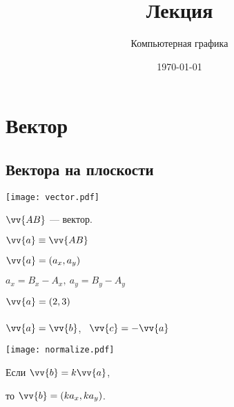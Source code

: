 \documentclass[10pt]{beamer}
\date{\today}
\title{Лекция \lecdni \\ \LectionTheme}
\subtitle{Компьютерная графика}
\begin{document}
	 

    
    \QRFRAME
	
	
	\frame{\maketitle}
	


	
	\begin{frame}
		\tableofcontents
	\end{frame}
	
	\section{Вектор}
	\subsection{Вектора на плоскости}
	
	\frame{\sectionpage}
	
    {   
    	{
    		 
			\texttt{[image: vector.pdf]}
    		

    	}
    	{
    		$\vv{AB}$ --- вектор.
    		
    		$ \vv{a} \equiv \vv{AB}$
    		
    		$\vv{a} = (a_x, a_y) $
    		
    		$a_x = B_x - A_x, \ a_y = B_y - A_y$
    		
	     	\hfill
	     	
	     	$\vv{a} = (2, 3)$	 \\  ~ \\
	     	
	     	$\vv{a\mathstrut} = \vv{b\mathstrut}$, \ $\vv{c\mathstrut} = -\vv{a\mathstrut}$
	     	
              
    		
    	}

    }
    
    
    {
    	{
    		
			\texttt{[image: normalize.pdf]}
    		
    		
    	}
    	{
    		Если $\vv{b} = k\vv{a}$, 
    		
    		\hfill
    		
    		то $\vv{b}  = (ka_x, ka_y)$.
    		

    		
    		
    	}
    	
    }
    
\end{document}
